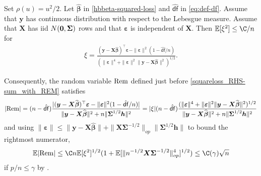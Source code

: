 \documentclass[11pt]{amsart}
\numberwithin{equation}{section}
\numberwithin{equation}{section}
\def\E{{\mathbb{E}}}
\def\Rem{\hbox{\rm Rem}}
\def\mathbold{\boldsymbol} %
\def\bh{\mathbold{h}}\def\hhat{\widehat{h}}\def\htil{\widetilde{h}}
\def\bX{\mathbold{X}}\def\hbX{{\widehat{\bX}}}\def\tbX{{\widetilde{\bX}}}\def\bXbar{{\overline \bX}}
\def\by{\mathbold{y}}\def\yhat{\widehat{y}}\def\ytil{\widetilde{y}}\def\ybar{{\overline y}}\def\vby{{\bf y}}
\def\bbeta{\mathbold{\beta}}\def\betahat{\widehat{\beta}}\def\hbeta{\widehat{\beta}}
\def\hbbeta{{{\widehat{\bbeta}}}}
\def\ep{\varepsilon}\def\eps{\epsilon}\def\veps{\varepsilon}
\def\bep{ {\mathbold{\ep} }}
\def\bSigma{\mathbold{\Sigma}}\def\hbSigma{{\widehat{\bSigma}}}
\def\df{{\hat{\mathsf{df}}}{}}
\begin{document}
\begin{proposition}
    \label{prop:eta_1}
    Set $\rho(u)=u^2/2$.
    Let $\hbbeta$ in \eqref{hbbeta-squared-loss} and
    $\df$ in \eqref{eq:def-df}.
    Assume that $\by$ has continuous distribution with respect to
    the Lebesgue measure.
    Assume that $\bX$ has iid $N({\bf 0,\bSigma})$ rows and
    that $\bep$ is independent of $\bX$. Then
    $\E[\xi^2]\le \C / n$ for
    \begin{align}
        \xi
        =
        \frac{(\by-\bX\hbbeta)^\top\bep - \|\bep\|^2(1-\df/n)}{
            (
            \|\bep\|^4
            +
            \|\bep\|^2\|\by-\bX\hbbeta\|^2
            )^{1/2}
    }
        .
        \label{xi}
    \end{align}
\end{proposition}
Consequently,
the random variable $\Rem$
defined just before \eqref{squareloss_RHS-sum_with_REM} satisfies
$$
|\Rem| = (n-\df)
\frac{
    |(\by-\bX\hbbeta)^\top\bep - \|\bep\|^2(1-\df/n)|
}
{
    \|\by-\bX\hbbeta\|^2 + n \|\bSigma^{1/2}\bh\|^2
}
=
|\xi|
(n-\df)
\frac{
    (\|\bep\|^4 + \|\bep\|^2\|\by-\bX\hbbeta\|^2)^{1/2}
}
{
    \|\by-\bX\hbbeta\|^2 + n \|\bSigma^{1/2}\bh\|^2
}
$$
and using $\|\bep\|\le \|\by-\bX\hbbeta\| + \|\bX\bSigma^{-1/2}\|_{op}
\|\bSigma^{1/2}\bh\|$ to bound the rightmost numerator,
\begin{equation}
\E|\Rem|
\le \C n
\E[\xi^2]^{1/2}
(1+\E[\|n^{-1/2}\bX\bSigma^{-1/2}\|_{op}^4]^{1/2})
\le \C(\gamma) \sqrt n
\label{eq:bound-Rem-noise}
\end{equation}
if $p/n\le \gamma$ by .
\end{document}
